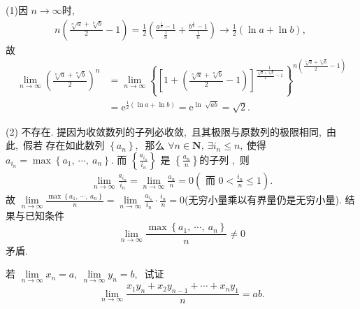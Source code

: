 \begin{solution}
	(1)因 $ n \rightarrow \infty $时,\ 
	$$\begin{array}{l}
		n\left(\frac{\sqrt[n]{a}+\sqrt[n]{b}}{2}-1\right)=\frac{1}{2}\left(\frac{a^{\frac{1}{n}}-1}{\frac{1}{n}}+\frac{b^{\frac{1}{n}}-1}{\frac{1}{n}}\right) \rightarrow \frac{1}{2}(\ln a+\ln b),\ 
	\end{array}$$
	故
	$$\begin{aligned}
		\lim\limits_{n\rightarrow\infty}\left(\frac{\sqrt[n]{a}+\sqrt[n]{b}}{2}\right)^n&=\lim\limits_{n\rightarrow\infty}\left\{\left[1+\left(\frac{\sqrt[n]{a}+\sqrt[n]{b}}{2}-1\right)\right]^{\frac{1}{\frac{\sqrt[n]{a}+\sqrt[n]{b}}{2}-1}}\right\}^{n\left(\frac{\sqrt[n]{a}+\sqrt[n]{b}}{2}-1\right)}\\
		&=\mathrm{e}^{\frac{1}{2}(\ln a+\ln b)}=\mathrm{e}^{\ln\sqrt[]{ab}}=\sqrt{2}.
	\end{aligned}$$
\end{solution}
(2) 不存在.
提因为收敛数列的子列必收敛,\  且其极限与原数列的极限相同,\  由此,\  假若 存在如此数列  $\left\{a_{n}\right\} ,\ $ 那么 $ \forall n \in \mathbf{N},\  \exists i_{n} \leqslant n ,\  $使得 $ a_{i_{n}}=\max \left\{a_{1},\  \cdots,\  a_{n}\right\} .$ 而 $ \left\{\frac{a_{i_{n}}}{i_{n}}\right\} $ 是 $ \left\{\frac{a_{n}}{n}\right\}  $的子列 ,\  则
$$\begin{array}{l}
	\lim\limits_{n \rightarrow \infty} \frac{a_{i_{n}}}{i_{n}}=\lim\limits_{n \rightarrow \infty} \frac{a_{n}}{n}=0\left(\text { 而 } 0<\frac{i_{n}}{n} \leqslant 1\right) .
\end{array}$$
故  $\lim\limits_{n \rightarrow \infty} \frac{\max \left\{a_{1},\  \cdots,\  a_{n}\right\}}{n}=\lim\limits_{n \rightarrow \infty} \frac{a_{i_{n}}}{i_{n}} \cdot \frac{i_{n}}{n}=0  $(无穷小量乘以有界量仍是无穷小量).
结果与已知条件 
$$ \lim\limits_{n \rightarrow \infty} \frac{\max \left\{a_{1},\  \cdots,\  a_{n}\right\}}{n} \neq 0$$
矛盾.
\newpage
\begin{problem}
	若  $\lim\limits_{n \rightarrow \infty} x_{n}=a,\  \lim\limits_{n \rightarrow \infty} y_{n}=b ,\ $ 试证 
	$$\lim\limits_{n \rightarrow \infty} \frac{x_{1} y_{n}+x_{2} y_{n-1}+\cdots+x_{n} y_{1}}{n}=a b .$$
\end{problem}
